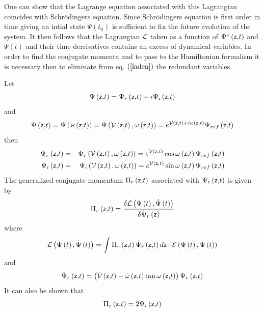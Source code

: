 One can show that the Lagrange equation associated with this Lagrangian
coincides with Schr\"{o}dingers equation. Since Schr\"{o}dingers equation is
first order in time giving an intial state $\Psi \left( t_{0}\right) $ is
sufficient to fix the future evolution of the system. It then follows that
the Lagrangian ${\cal L}$ taken as a function of $\Psi ^{\ast }\left( {\sf z,%
}t\right) $ and $\Psi \left( t\right) $ and their time derrivatives contains
an excess of dynamical variables. In order to find the conjugate momenta and
to pass to the Hamiltonian formalism it is necessary then to eliminate from
eq. $\left( \ref{laden}\right) $ the redundant variables.

Let 
\begin{equation}
\Psi \left( {\sf z,}t\right) =\Psi _{r}\left( {\sf z,}t\right) +i\Psi
_{i}\left( {\sf z,}t\right) 
\end{equation}%
and 
\begin{equation}
\Psi \left( {\sf z,}t\right) =\Psi \left( {\cal \varkappa }\left( {\sf z,}%
t\right) \right) =\Psi \left( {\cal V}\left( {\sf z,}t\right) ,\omega \left( 
{\sf z,}t\right) \right) =e^{{\cal V}\left( {\sf z,}t\right) +i\omega \left( 
{\sf z,}t\right) }\Psi _{ref}\left( {\sf z,}t\right) 
\end{equation}%
then 
\begin{eqnarray}
\Psi _{r}\left( {\sf z,}t\right)  &=&\Psi _{r}\left( {\cal V}\left( {\sf z,}%
t\right) ,\omega \left( {\sf z,}t\right) \right) =e^{{\cal V}\left( {\sf z,}%
t\right) }\cos \omega \left( {\sf z,}t\right) \Psi _{ref}\left( {\sf z,}%
t\right)   \nonumber \\
\Psi _{i}\left( {\sf z,}t\right)  &=&\Psi _{i}\left( {\cal V}\left( {\sf z,}%
t\right) ,\omega \left( {\sf z,}t\right) \right) =e^{{\cal V}\left( {\sf z,}%
t\right) }\sin \omega \left( {\sf z,}t\right) \Psi _{ref}\left( {\sf z,}%
t\right) 
\end{eqnarray}%
The generalized conjugate momentum $\Pi _{r}\left( {\sf z,}t\right) $
associated with $\Psi _{r}\left( {\sf z,}t\right) $ is given by 
\begin{equation}
\Pi _{r}\left( {\sf z,}t\right) =\frac{\delta {\cal L}\left( \Psi \left(
t\right) ,\dot{\Psi}\left( t\right) \right) }{\delta \dot{\Psi}_{r}\left( 
{\sf z}\right) }
\end{equation}%
where 
\begin{equation}
{\cal L}\left( \Psi \left( t\right) ,\dot{\Psi}\left( t\right) \right) =\int
\Pi _{r}\left( {\sf z,}t\right) \dot{\Psi}_{r}\left( {\sf z,}t\right) d{\sf %
z-}{\cal E}\left( \Psi \left( t\right) ,\Psi \left( t\right) \right) 
\end{equation}%
and 
\begin{equation}
\dot{\Psi}_{r}\left( {\sf z,}t\right) =\left( {\cal \dot{V}}\left( {\sf z,}%
t\right) -\dot{\omega}\left( {\sf z,}t\right) \tan \omega \left( {\sf z,}%
t\right) \right) \Psi _{r}\left( {\sf z,}t\right) 
\end{equation}%
It can also be shown that 
\begin{equation}
\Pi _{r}\left( {\sf z,}t\right) =2\Psi _{i}\left( {\sf z,}t\right) 
\end{equation}


